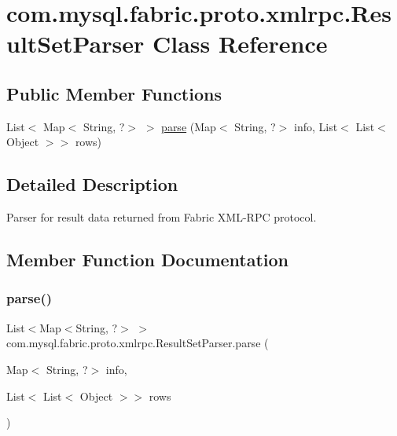 \hypertarget{classcom_1_1mysql_1_1fabric_1_1proto_1_1xmlrpc_1_1_result_set_parser}{}\section{com.\+mysql.\+fabric.\+proto.\+xmlrpc.\+Result\+Set\+Parser Class Reference}
\label{classcom_1_1mysql_1_1fabric_1_1proto_1_1xmlrpc_1_1_result_set_parser}
\subsection*{Public Member Functions}
\begin{DoxyCompactItemize}
\item 
List$<$ Map$<$ String, ?$>$ $>$ \mbox{\hyperlink{classcom_1_1mysql_1_1fabric_1_1proto_1_1xmlrpc_1_1_result_set_parser_ae6722c8b7a44f8f139ab0bbfe34bb0d8}{parse}} (Map$<$ String, ?$>$ info, List$<$ List$<$ Object $>$$>$ rows)
\end{DoxyCompactItemize}


\subsection{Detailed Description}
Parser for result data returned from Fabric X\+M\+L-\/\+R\+PC protocol. 

\subsection{Member Function Documentation}
\mbox{\label{classcom_1_1mysql_1_1fabric_1_1proto_1_1xmlrpc_1_1_result_set_parser_ae6722c8b7a44f8f139ab0bbfe34bb0d8}} 
\subsubsection{\texorpdfstring{parse()}{parse()}}
{\footnotesize\ttfamily List$<$Map$<$String, ?$>$ $>$ com.\+mysql.\+fabric.\+proto.\+xmlrpc.\+Result\+Set\+Parser.\+parse (\begin{DoxyParamCaption}\item[{Map$<$ String, ?$>$}]{info,  }\item[{List$<$ List$<$ Object $>$$>$}]{rows }\end{DoxyParamCaption})}

